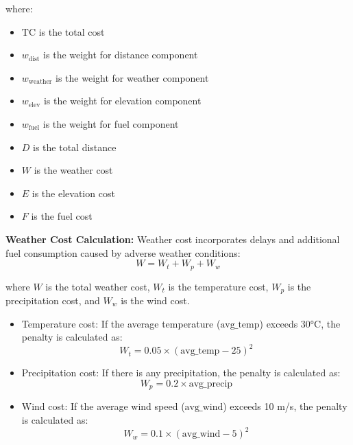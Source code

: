 \noindent where:
\begin{itemize}
    \item $\text{TC}$ is the total cost
    \item $w_{\text{dist}}$ is the weight for distance component
    \item $w_{\text{weather}}$ is the weight for weather component
    \item $w_{\text{elev}}$ is the weight for elevation component
    \item $w_{\text{fuel}}$ is the weight for fuel component
    \item $D$ is the total distance
    \item $W$ is the weather cost
    \item $E$ is the elevation cost
    \item $F$ is the fuel cost
\end{itemize}

\textbf{Weather Cost Calculation:}
Weather cost incorporates delays and additional fuel consumption caused by adverse weather conditions:
\begin{equation}
    W = W_t + W_p + W_w
\end{equation}

where $W$ is the total weather cost, $W_t$ is the temperature cost, $W_p$ is the precipitation cost, and $W_w$ is the wind cost.

\begin{itemize}
    \item Temperature cost: If the average temperature ($\text{avg\_temp}$) exceeds 30°C, the penalty is calculated as:
          \begin{equation}
              W_t = 0.05 \times (\text{avg\_temp} - 25)^2
          \end{equation}

    \item Precipitation cost: If there is any precipitation, the penalty is calculated as:
          \begin{equation}
              W_p = 0.2 \times \text{avg\_precip}
          \end{equation}

    \item Wind cost: If the average wind speed ($\text{avg\_wind}$) exceeds 10 m/s, the penalty is calculated as:
          \begin{equation}
              W_w = 0.1 \times (\text{avg\_wind} - 5)^2
          \end{equation}
\end{itemize}

